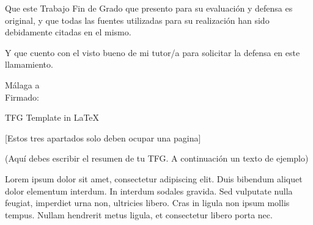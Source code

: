 \documentclass[13pt,a4paper]{report}
\numberwithin{figure}{section} %
\numberwithin{table}{section} %
\begin{document}
Que este Trabajo Fin de Grado que presento para su evaluación y defensa es original, y que todas las fuentes utilizadas para su realización han sido debidamente citadas en el mismo. 

\vspace{12pt}

Y que cuento con el visto bueno de mi tutor/a para solicitar la defensa en este llamamiento.
\begin{flushright}
    Málaga a  \makebox[2cm]{\dotfill} \\ %
    \vspace{5cm}
     Firmado: \makebox[5cm]{\dotfill} %
\end{flushright}



\newpage
{} %

\renewcommand{\contentsname}{ÍNDICE} 
\tableofcontents

\newpage 
{} %

\vspace{12pt}

\noindent TFG Template in \LaTeX %

\vspace{12pt}


\vspace{12pt}

[Estos tres apartados solo deben ocupar una pagina]

\vspace{12pt}

(Aquí debes escribir el resumen de tu TFG. A continuación un texto de ejemplo)

\vspace{12pt}

Lorem ipsum dolor sit amet, consectetur adipiscing elit. Duis bibendum aliquet dolor elementum interdum. In interdum sodales gravida. Sed vulputate nulla feugiat, imperdiet urna non, ultricies libero. Cras in ligula non ipsum mollis tempus. Nullam hendrerit metus ligula, et consectetur libero porta nec. 
\end{document}
